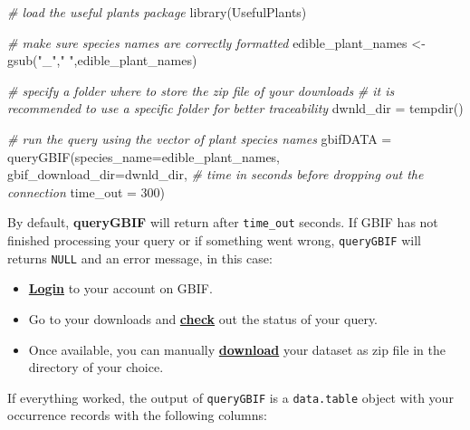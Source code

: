\documentclass[
]{article}
\newenvironment{Shaded}{\begin{snugshade}}{\end{snugshade}}
\newcommand{\AttributeTok}[1]{\textcolor[rgb]{0.77,0.63,0.00}{#1}}
\newcommand{\CommentTok}[1]{\textcolor[rgb]{0.56,0.35,0.01}{\textit{#1}}}
\newcommand{\DecValTok}[1]{\textcolor[rgb]{0.00,0.00,0.81}{#1}}
\newcommand{\FunctionTok}[1]{\textcolor[rgb]{0.00,0.00,0.00}{#1}}
\newcommand{\NormalTok}[1]{#1}
\newcommand{\OtherTok}[1]{\textcolor[rgb]{0.56,0.35,0.01}{#1}}
\newcommand{\StringTok}[1]{\textcolor[rgb]{0.31,0.60,0.02}{#1}}
\begin{document}
\begin{Shaded}
\begin{Highlighting}[]

\CommentTok{\# load the useful plants package}
\FunctionTok{library}\NormalTok{(UsefulPlants)}

\CommentTok{\# make sure species names are correctly formatted }
\NormalTok{edible\_plant\_names }\OtherTok{\textless{}{-}} \FunctionTok{gsub}\NormalTok{(}\StringTok{"\_"}\NormalTok{,}\StringTok{" "}\NormalTok{,edible\_plant\_names)}

\CommentTok{\# specify a folder where to store the zip file of your downloads}
\CommentTok{\# it is recommended to use a specific folder for better traceability}
\NormalTok{dwnld\_dir }\OtherTok{=} \FunctionTok{tempdir}\NormalTok{()}
  
\CommentTok{\# run the query using the vector of plant species names}
\NormalTok{gbifDATA }\OtherTok{=} \FunctionTok{queryGBIF}\NormalTok{(}\AttributeTok{species\_name=}\NormalTok{edible\_plant\_names,}
                \AttributeTok{gbif\_download\_dir=}\NormalTok{dwnld\_dir,}
                \CommentTok{\# time in seconds before dropping out the connection}
                \AttributeTok{time\_out =} \DecValTok{300}\NormalTok{)}
\end{Highlighting}
\end{Shaded}

\begin{infobox}

By default, \textbf{queryGBIF} will return after \texttt{time\_out}
seconds. If GBIF has not finished processing your query or if something
went wrong, \texttt{queryGBIF} will returns \texttt{NULL} and an error
message, in this case:

\begin{itemize}
\item
  \textbf{\underline{Login}} to your account on GBIF.
\item
  Go to your downloads and \textbf{\underline{check}} out the status of
  your query.
\item
  Once available, you can manually \textbf{\underline{download}} your
  dataset as zip file in the directory of your choice.
\end{itemize}

\end{infobox}

If everything worked, the output of \texttt{queryGBIF} is a
\texttt{data.table} object with your occurrence records with the
following columns:
\end{document}
